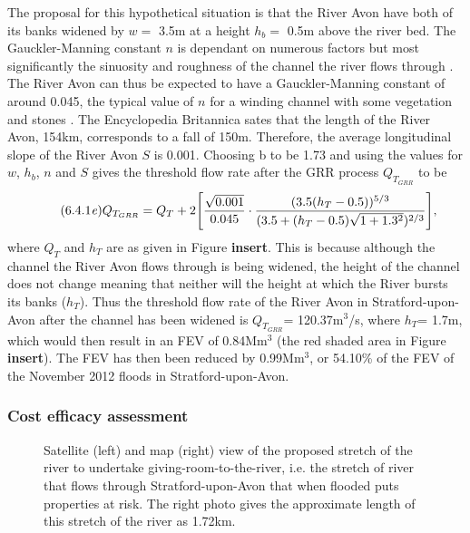 \documentclass[11pt,a4paper]{article}
\begin{document}
The proposal for this hypothetical situation is that the River Avon have both of its banks widened by $w=$ 3.5m at a height $h_b=$ 0.5m above the river bed. The Gauckler-Manning constant $n$ is dependant on numerous factors but most significantly the sinuosity and roughness of the channel the river flows through \cite{manning}. The River Avon can thus be expected to have a Gauckler-Manning constant of around 0.045, the typical value of $n$ for a winding channel with some vegetation and stones \cite{n}. The Encyclopedia Britannica \cite{britannica} sates that the length of the River Avon, 154km, corresponds to a fall of 150m. Therefore, the average longitudinal slope of the River Avon $S$ is 0.001. Choosing b to be 1.73 and using the values for $w$, $h_b$, $n$ and $S$ gives the threshold flow rate after the GRR process $Q_{T_{GRR}}$ to be
\begin{equation}\tag{6.4.1\textit{e}}
Q_{T_{GRR}}=Q_T+2\Bigg[\frac{\sqrt{0.001}}{0.045}\cdot\frac{(3.5(h_T-0.5))^{5/3}}{(3.5+(h_T-0.5)\sqrt{1+1.3^2})^{2/3}}\Bigg],
\end{equation}
where $Q_T$ and $h_T$ are as given in Figure \textbf{insert}. This is because although the channel the River Avon flows through is being widened, the height of the channel does not change meaning that neither will the height at which the River bursts its banks ($h_T$). Thus the threshold flow rate of the River Avon in Stratford-upon-Avon after the channel has been widened is $Q_{T_{GRR}}$= 120.37m$^3$/s, where $h_T$= 1.7m, which would then result in an FEV of 0.84Mm$^3$ (the red shaded area in Figure \textbf{insert}). The FEV has then been reduced by 0.99Mm$^3$, or 54.10\% of the FEV of the November 2012 floods in Stratford-upon-Avon.

\subsubsection{Cost efficacy assessment}
\begin{figure}[ht!]
\caption{Satellite (left) and map (right) view \cite{maps} of the proposed stretch of the river to undertake giving-room-to-the-river, i.e. the stretch of river that flows through Stratford-upon-Avon that when flooded puts properties at risk. The right photo gives the approximate length of this stretch of the river as 1.72km.}
\end{figure}
\end{document}
